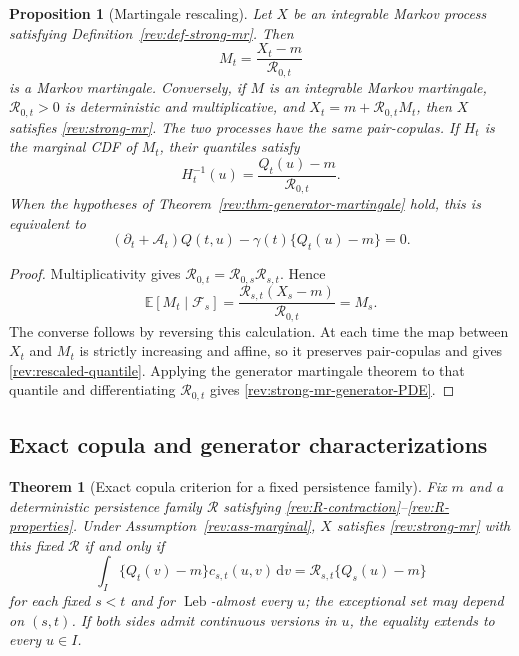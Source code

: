 \documentclass[11pt]{article}
\newtheorem{theorem}[definition]{Theorem}
\newtheorem{proposition}[definition]{Proposition}
\theoremstyle{remark}
\newcommand{\E}{\mathbb E}
\newcommand{\dd}{\,\mathrm d}
\newcommand{\Leb}{\operatorname{Leb}}
\begin{document}
\begin{proposition}[Martingale rescaling]
\label{rev:prop-martingale-rescaling}
Let $X$ be an integrable Markov process satisfying
Definition~\ref{rev:def-strong-mr}.  Then
\begin{equation}
M_t=\frac{X_t-m}{\mathcal R_{0,t}}
\label{rev:martingale-rescaling}
\end{equation}
is a Markov martingale.  Conversely, if $M$ is an integrable Markov martingale,
$\mathcal R_{0,t}>0$ is deterministic and multiplicative, and
$X_t=m+\mathcal R_{0,t}M_t$, then $X$ satisfies
\eqref{rev:strong-mr}.  The two processes have the same pair-copulas.  If
$H_t$ is the marginal CDF of $M_t$, their quantiles satisfy
\begin{equation}
H_t^{-1}(u)=\frac{Q_t(u)-m}{\mathcal R_{0,t}}.
\label{rev:rescaled-quantile}
\end{equation}
When the hypotheses of Theorem~\ref{rev:thm-generator-martingale} hold, this is
equivalent to
\begin{equation}
(\partial_t+\mathcal A_t)Q(t,u)
-\gamma(t)\{Q_t(u)-m\}=0.
\label{rev:strong-mr-generator-PDE}
\end{equation}
\end{proposition}

\begin{proof}
Multiplicativity gives
$\mathcal R_{0,t}=\mathcal R_{0,s}\mathcal R_{s,t}$.  Hence
\[
\E[M_t\mid\mathcal F_s]
=\frac{\mathcal R_{s,t}(X_s-m)}{\mathcal R_{0,t}}
=M_s.
\]
The converse follows by reversing this calculation.  At each time the map
between $X_t$ and $M_t$ is strictly increasing and affine, so it preserves
pair-copulas and gives \eqref{rev:rescaled-quantile}.  Applying the generator
martingale theorem to that quantile and differentiating
$\mathcal R_{0,t}$ gives \eqref{rev:strong-mr-generator-PDE}.
\end{proof}

\subsection{Exact copula and generator characterizations}

\begin{theorem}[Exact copula criterion for a fixed persistence family]
\label{rev:thm-exact-mr}
Fix $m$ and a deterministic persistence family $\mathcal R$ satisfying
\eqref{rev:R-contraction}--\eqref{rev:R-properties}.  Under
Assumption~\ref{rev:ass-marginal}, $X$ satisfies
\eqref{rev:strong-mr} with this fixed $\mathcal R$ if and only if
\begin{equation}
\int_I\{Q_t(v)-m\}c_{s,t}(u,v)\dd v
=\mathcal R_{s,t}\{Q_s(u)-m\}
\label{rev:exact-mr-copula}
\end{equation}
for each fixed $s<t$ and for $\Leb$-almost every $u$; the exceptional set may
depend on $(s,t)$.  If both sides admit continuous versions in $u$, the equality
extends to every $u\in I$.
\end{theorem}
\end{document}
